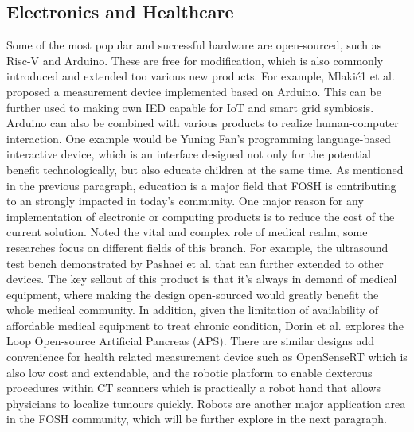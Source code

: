 \documentclass[final-report.tex]{subfiles}
\begin{document}
\subsection{Electronics and Healthcare}
Some of the most popular and successful hardware are open-sourced, such as Risc-V and Arduino. 
These are free for modification, which is also commonly introduced and extended too various new products. 
For example, Mlakić1 et al. proposed a measurement device implemented based on Arduino. 
This can be further used to making own IED capable for IoT and smart grid symbiosis. 
Arduino can also be combined with various products to realize human-computer interaction. 
One example would be Yuning Fan's programming language-based interactive device, which is an interface designed not only for the potential benefit technologically, but also educate children at the same time. 
As mentioned in the previous paragraph, education is a major field that FOSH is contributing to an strongly impacted in today's community.  
One major reason for any implementation of electronic or computing products is to reduce the cost of the current solution. Noted the vital and complex role of medical realm, some researches  focus on different fields of this branch. 
For example, the ultrasound test bench demonstrated by Pashaei et al. that can further extended to other devices. 
The key sellout of this product is that it's always in demand of medical equipment, where making the design open-sourced would greatly benefit the whole medical community. 
In addition, given the limitation of availability of affordable medical equipment to treat chronic condition, Dorin et al. explores the Loop Open-source Artificial Pancreas (APS).
There are similar designs add convenience for health related measurement device such as OpenSenseRT which is also low cost and extendable,
and the robotic platform to enable dexterous procedures within CT scanners which is practically a robot hand that allows physicians to localize tumours quickly. Robots are another major application area in the FOSH community, which will be further explore in the next paragraph. 
\end{document}
